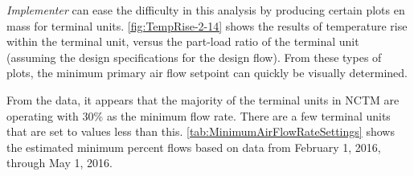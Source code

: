 \textit{Implementer} can ease the difficulty in this analysis by producing
certain plots en mass for terminal units.  \figref{} \ref{fig:TempRise-2-14}
shows the results of temperature rise within the terminal unit, versus the
part-load ratio of the terminal unit (assuming the design specifications for
the design flow). From these types of plots, the minimum primary air flow
setpoint can quickly be visually determined.

From the data, it appears that the majority of the terminal units in NCTM are
operating with 30\% as the minimum flow rate. There are a few terminal units
that are set to values less than this. \tableref{}
\ref{tab:MinimumAirFlowRateSettings} shows the estimated minimum percent flows
based on data from February 1, 2016, through May 1, 2016.  





